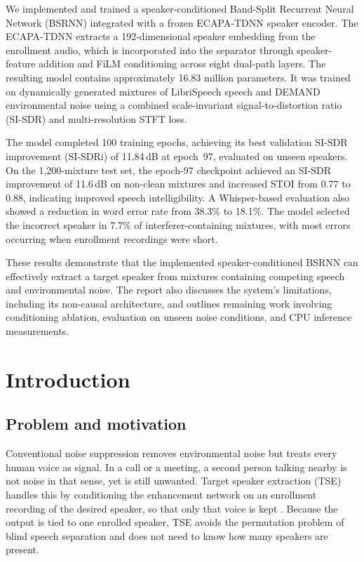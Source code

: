 \documentclass[11pt,a4paper]{article}
\begin{document}
We implemented and trained a speaker-conditioned Band-Split Recurrent Neural Network (BSRNN)
integrated with a frozen ECAPA-TDNN speaker encoder. The ECAPA-TDNN extracts a 192-dimensional
speaker embedding from the enrollment audio, which is incorporated into the separator through
speaker-feature addition and FiLM conditioning across eight dual-path layers. The resulting model
contains approximately 16.83 million parameters. It was trained on dynamically generated mixtures
of LibriSpeech speech and DEMAND environmental noise using a combined scale-invariant
signal-to-distortion ratio (SI-SDR) and multi-resolution STFT loss.

The model completed 100 training epochs, achieving its best validation SI-SDR improvement
(SI-SDRi) of 11.84\,dB at epoch~97, evaluated on unseen speakers. On the 1,200-mixture test set,
the epoch-97 checkpoint achieved an SI-SDR improvement of 11.6\,dB on non-clean mixtures and
increased STOI from 0.77 to 0.88, indicating improved speech intelligibility. A Whisper-based
evaluation also showed a reduction in word error rate from 38.3\% to 18.1\%. The model selected
the incorrect speaker in 7.7\% of interferer-containing mixtures, with most errors occurring when
enrollment recordings were short.

These results demonstrate that the implemented speaker-conditioned BSRNN can effectively extract
a target speaker from mixtures containing competing speech and environmental noise. The report
also discusses the system's limitations, including its non-causal architecture, and outlines
remaining work involving conditioning ablation, evaluation on unseen noise conditions, and CPU
inference measurements.

\newpage
\begingroup
\small
\setlength{\parskip}{0pt}
\tableofcontents
\endgroup
\newpage

\section{Introduction}
\label{sec:intro}

\subsection{Problem and motivation}
Conventional noise suppression removes environmental noise but treats every human voice as
signal. In a call or a meeting, a second person talking nearby is not noise in that sense, yet is
still unwanted. Target speaker extraction (TSE) handles this by conditioning the enhancement
network on an enrollment recording of the desired speaker, so that only that voice is kept
\cite{wang2019voicefilter, sato2024speakerbeamss}. Because the output is tied to one enrolled
speaker, TSE avoids the permutation problem of blind speech separation and does not need to know
how many speakers are present.
\end{document}
